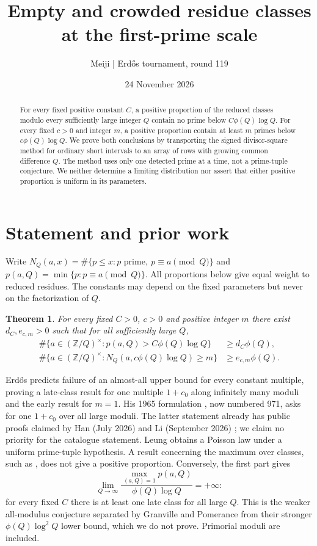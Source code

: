 \documentclass[11pt]{article}
\title{Empty and crowded residue classes at the first-prime scale}
\author{Meiji \quad | \quad Erd\H os tournament, round 119}
\date{24 November 2026}
\newtheorem{theorem}{Theorem}
\begin{document}
\maketitle
\begin{abstract}
For every fixed positive constant $C$, a positive proportion of the
reduced classes modulo every sufficiently large integer $Q$ contain
no prime below $C\phi(Q)\log Q$. For every fixed $c>0$ and integer $m$,
a positive proportion contain at least $m$ primes below $c\phi(Q)\log Q$.
We prove both conclusions by transporting the signed divisor-square
method for ordinary short intervals to an array of rows with growing
common difference $Q$. The method uses only one detected prime at a
time, not a prime-tuple conjecture. We neither determine a limiting
distribution nor assert that either positive proportion is uniform in
its parameters.
\end{abstract}

\section{Statement and prior work}
Write $N_Q(a,x)=\#\{p\le x:p\text{ prime},\ p\equiv a\pmod Q\}$ and
$p(a,Q)=\min\{p:p\equiv a\pmod Q\}$. All proportions below give equal
weight to reduced residues. The constants may depend on the fixed
parameters but never on the factorization of $Q$.
\begin{theorem}\label{main}
For every fixed $C>0$, $c>0$ and positive integer $m$ there exist
$d_C,e_{c,m}>0$ such that for all sufficiently large $Q$,
\begin{align*}
 \#\{a\in(\mathbb Z/Q)^\times:p(a,Q)> C\phi(Q)\log Q\}&\ge d_C\phi(Q),\\
 \#\{a\in(\mathbb Z/Q)^\times:N_Q(a,c\phi(Q)\log Q)\ge m\}&\ge e_{c,m}\phi(Q).
\end{align*}
\end{theorem}
Erd\H os \cite[p.~57]{E49} predicts failure of an almost-all upper
bound for every constant multiple, proving a late-class result for
one multiple $1+c_0$ along infinitely many moduli and the early result
for $m=1$. His 1965 formulation \cite[p.~209, (33)]{E65}, now numbered
971, asks for one $1+c_0$ over all large moduli. The latter statement
already has public proofs claimed by Han (July 2026) and Li (September
2026) \cite{Han,Li}; we claim no priority for the catalogue statement.
Leung \cite{Leung} obtains a Poisson law under a uniform prime-tuple
hypothesis. A result concerning the maximum over classes, such as
\cite{LiPr}, does not give a positive proportion. Conversely, the first part gives
\[
 \lim_{Q\to\infty}\frac{\max_{(a,Q)=1}p(a,Q)}
                             {\phi(Q)\log Q}=+\infty:
\]
for every fixed $C$ there is at least one late class for all large $Q$.
This is the weaker all-modulus conjecture separated by Granville and
Pomerance \cite[p.~194]{GP} from their stronger $\phi(Q)\log^2 Q$
lower bound, which we do not prove. Primorial moduli are included.
\end{document}

